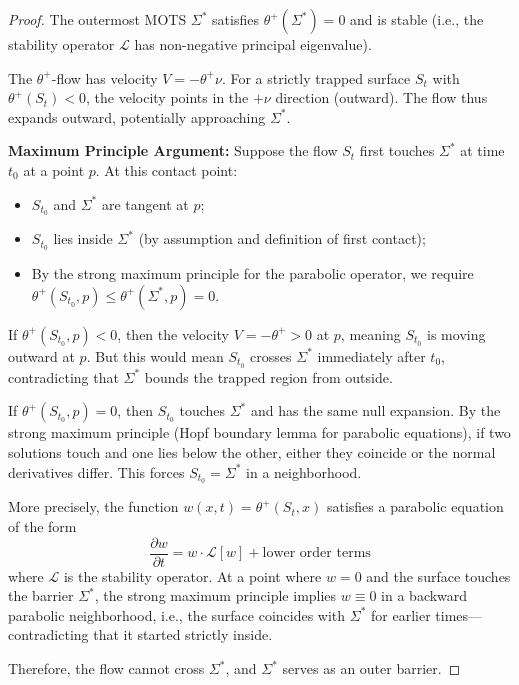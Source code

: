 \begin{proof}
The outermost MOTS $\Sigma^*$ satisfies $\theta^+(\Sigma^*) = 0$ and is stable (i.e., the stability operator $\mathcal{L}$ has non-negative principal eigenvalue).

The $\theta^+$-flow has velocity $V = -\theta^+\nu$. For a strictly trapped surface $S_t$ with $\theta^+(S_t) < 0$, the velocity points in the $+\nu$ direction (outward). The flow thus expands outward, potentially approaching $\Sigma^*$.

\textbf{Maximum Principle Argument:}
Suppose the flow $S_t$ first touches $\Sigma^*$ at time $t_0$ at a point $p$. At this contact point:
\begin{itemize}
    \item $S_{t_0}$ and $\Sigma^*$ are tangent at $p$;
    \item $S_{t_0}$ lies inside $\Sigma^*$ (by assumption and definition of first contact);
    \item By the strong maximum principle for the parabolic operator, we require $\theta^+(S_{t_0}, p) \leq \theta^+(\Sigma^*, p) = 0$.
\end{itemize}

If $\theta^+(S_{t_0}, p) < 0$, then the velocity $V = -\theta^+ > 0$ at $p$, meaning $S_{t_0}$ is moving outward at $p$. But this would mean $S_{t_0}$ crosses $\Sigma^*$ immediately after $t_0$, contradicting that $\Sigma^*$ bounds the trapped region from outside.

If $\theta^+(S_{t_0}, p) = 0$, then $S_{t_0}$ touches $\Sigma^*$ and has the same null expansion. By the strong maximum principle (Hopf boundary lemma for parabolic equations), if two solutions touch and one lies below the other, either they coincide or the normal derivatives differ. This forces $S_{t_0} = \Sigma^*$ in a neighborhood.

More precisely, the function $w(x,t) = \theta^+(S_t, x)$ satisfies a parabolic equation of the form
\begin{equation}
    \frac{\partial w}{\partial t} = w \cdot \mathcal{L}[w] + \text{lower order terms}
\end{equation}
where $\mathcal{L}$ is the stability operator. At a point where $w = 0$ and the surface touches the barrier $\Sigma^*$, the strong maximum principle implies $w \equiv 0$ in a backward parabolic neighborhood, i.e., the surface coincides with $\Sigma^*$ for earlier times---contradicting that it started strictly inside.

Therefore, the flow cannot cross $\Sigma^*$, and $\Sigma^*$ serves as an outer barrier.
\end{proof}

